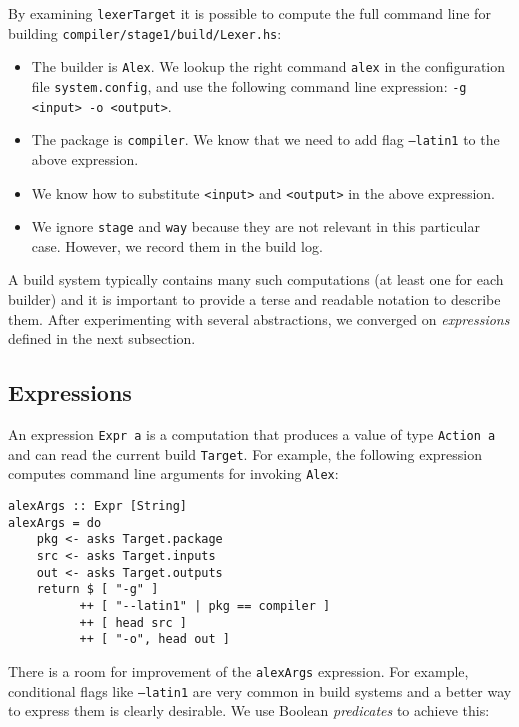 By examining \texttt{lexerTarget} it is possible to compute the full command
line for building \texttt{compiler/stage1/build/Lexer.hs}:
\begin{itemize}
  \item The builder is \texttt{Alex}. We lookup the right command
  \texttt{alex} in the configuration file \texttt{system.config}, and use the
  following command line expression: \texttt{-g <input> -o <output>}.
  \item The package is \texttt{compiler}. We know that we need to add
  flag \texttt{--latin1} to the above expression.
  \item We know how to substitute \texttt{<input>} and \texttt{<output>} in the
  above expression.
  \item We ignore \texttt{stage} and \texttt{way} because they are not relevant
  in this particular case. However, we record them in the build log.
\end{itemize}

A build system typically contains many such computations (at least one for each
builder) and it is important to provide a terse and readable notation to
describe them. After experimenting with several abstractions, we converged on
\emph{expressions} defined in the next subsection.

\subsection{Expressions}

An expression \texttt{Expr a} is a computation that produces a value of type
\texttt{Action a} and can read the current build \texttt{Target}. For example,
the following expression computes command line arguments for invoking
\texttt{Alex}:

\begin{lstlisting}[basicstyle=\ttfamily]
alexArgs :: Expr [String]
alexArgs = do
    pkg <- asks Target.package
    src <- asks Target.inputs
    out <- asks Target.outputs
    return $ [ "-g" ]
          ++ [ "--latin1" | pkg == compiler ]
          ++ [ head src ]
          ++ [ "-o", head out ]
\end{lstlisting}


There is a room for improvement of the \texttt{alexArgs} expression. For
example, conditional flags like \texttt{--latin1} are very common in build
systems and a better way to express them is clearly desirable. We use Boolean
\emph{predicates} to achieve this:


